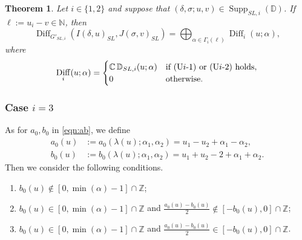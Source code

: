 \documentclass[a4paper,11pt,reqno]{amsart}
\newcommand{\DD}{\mathbb{D}}
\newcommand{\0}{{\bf 0}}
\newcommand{\N}{\mathbb{N}}
\newcommand{\Z}{\mathbb{Z}}
\newcommand{\C}{\mathbb{C}}
\newcommand{\1}{{\bf 1}}
\DeclareMathOperator{\Supp}{Supp}
\DeclareMathOperator{\Diff}{Diff}
\theoremstyle{plain}
\newtheorem{theorem}[equation]{Theorem}
\theoremstyle{definition}
\numberwithin{equation}{section}
\theoremstyle{definition}
\begin{document}
\begin{theorem}\label{thm:consSL12}
Let $i \in \{1, 2\}$ and suppose that $(\delta,\sigma; u, v) \in \Supp_{SL,i}(\DD)$.
If $\ell:=u_i-v \in \N$, then
\begin{equation*}
\Diff_{G'_{SL,i}}(I(\delta,u)_{SL}, J(\sigma,v)_{SL})
=\bigoplus_{\alpha \in\Gamma_i(\ell)}
\Diff_i(u;\alpha),
\end{equation*}
where
\begin{equation*}
\Diff_i(u;\alpha)
=
\begin{cases}
\C\, \DD_{SL,i}(u;\alpha)& \textnormal{if (U$i$-1) or (U$i$-2) holds},\\
0 & \textnormal{otherwise}.
\end{cases}
\end{equation*}
\end{theorem}

\subsubsection{Case \texorpdfstring{$i=3$}{i=3}}
\label{sec:SL_Case3}

As for $a_0, b_0$ in  \eqref{eqn:ab}, we define
\begin{align*}
a_0(u) &:=a_0(\lambda(u);\alpha_1,\alpha_2)= u_1-u_2+\alpha_1-\alpha_2, \\[3pt]
b_0(u) &:=b_0(\lambda(u);\alpha_1,\alpha_2)
= u_1+u_2-2+\alpha_1+\alpha_2.
\end{align*} 
Then we consider the following conditions.
\vskip 0.1in
\begin{enumerate}[label=\normalfont{(\arabic*)}]
\item[(V1)] $b_0 (u)\notin [0,\min(\alpha)-1]\cap \Z$;
\vspace{2pt}
\item[(V2)] $b_0(u) \in [0,\min(\alpha)-1]\cap \Z$ and 
$\frac{a_0(u)-b_0(u)}{2} \notin [-b_0(u),0]\cap \Z$;
\vspace{2pt}
\item[(V3)] $b_0(u)\in [0,\min(\alpha)-1]\cap \Z$ 
and $\frac{a_0(u)-b_0(u)}{2}\in [-b_0(u),0]\cap \Z$.
\end{enumerate}

\vspace{5pt}
\end{document}
